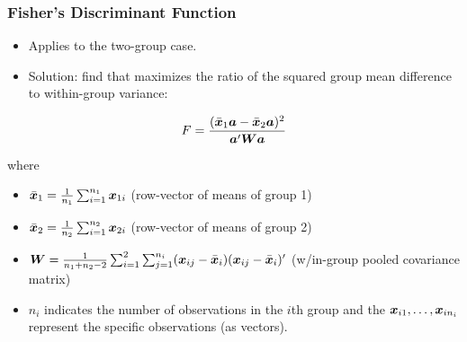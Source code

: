 \documentclass{beamer}
\begin{document}
\begin{frame}
  \frametitle{Fisher's Discriminant Function}

\begin{itemize}
\item Applies to the two-group case.
\item Solution: find  that maximizes the ratio of the squared group mean difference to within-group variance:
\end{itemize}

\[
F = \frac{(\bar{\bm{x}}_1\bm{a} - \bar{\bm{x}}_2\bm{a})^2}{\bm{a}'\bm{W}\bm{a}}
\]

where
\begin{itemize}
\item $\bar{\bm{x}}_1 = \frac{1}{n_1}\sum_{i=1}^{n_1} \bm{x}_{1i}$ (row-vector of means of group 1)
\item $\bar{\bm{x}}_2 = \frac{1}{n_2}\sum_{i=1}^{n_2} \bm{x}_{2i}$ (row-vector of means of group 2)
\item $\bm{W} = \frac{1}{n_1 + n_2 - 2}\sum_{i=1}^{2}\sum_{j=1}^{n_i}(\bm{x}_{ij} - \bar{\bm{x}}_i)(\bm{x}_{ij} - \bar{\bm{x}}_i)'$ (w/in-group pooled covariance matrix)
\item $n_i$ indicates the number of observations in the $i$th group and the $\bm{x}_{i1},\ldots,\bm{x}_{in_i}$ represent the specific observations (as vectors).
\end{itemize}

%
%
%
%

\end{frame}

\end{document}
